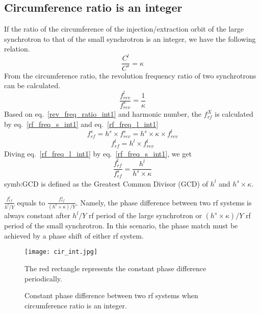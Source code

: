 \subsection{Circumference ratio is an integer}
If the ratio of the circumference of the injection/extraction orbit of the large synchrotron to that of the small synchrotron is an integer, we have the following relation. 
\begin{equation}
\frac{C^l}{C^s}=\kappa \label{circumference_ratio_int1}
\end{equation}
From the circumference ratio, the revolution frequency ratio of two synchrotrons can be calculated.
\begin{equation}
\frac{f_{\mathit{rev}}^{l}}{f_{\mathit{rev}}^{s}}=\frac{1}{\kappa} \label{rev_freq_ratio_int1}
\end{equation}
Based on eq.~\ref{rev_freq_ratio_int1} and harmonic number, the $f_{rf}^{X}$ is calculated by eq.~\ref{rf_freq_s_int1} and eq.~\ref{rf_freq_l_int1}
\begin{equation} 
f_{\mathit{rf}}^{s}= h^s \times f_{\mathit{rev}}^{s}=h^s \times \kappa \times f_{rev}^{l} \label{rf_freq_s_int1}
\end{equation}
\begin{equation} 
f_{\mathit{rf}}^{l}= h^l \times f_{\mathit{rev}}^{l} \label{rf_freq_l_int1}
\end{equation}
Diving eq.~\ref{rf_freq_l_int1} by eq.~\ref{rf_freq_s_int1}, we get
\begin{equation} 
\frac{f_{\mathit{rf}}^{l}}{f_{\mathit{rf}}^{s}}= \frac{h^l}{h^s \times \kappa} \label{rf_freq_ratio1}
\end{equation}
\gls{symb:GCD} is defined as the Greatest Common Divisor (\gls{GCD}) of $h^l$ and $h^s \times \kappa$.

$\frac{f_{\mathit{rf}}^{l}}{h^l/Y}$ equals to $\frac{f_{\mathit{rf}}^{s}}{(h^s\times \kappa)/Y}$. Namely, the phase difference between two rf systems is always constant after ${h^l/Y}$ rf period of the large synchrotron or ${(h^s\times \kappa)/Y}$ rf period of the small synchrotron. In this scenario, the phase match must be achieved by a phase shift of either rf system. 
\begin{figure}[!htb]
   \centering   
   \texttt{[image: cir\_int.jpg]}
   \caption{Constant phase difference between two rf systems when circumference ratio is an integer.}{The red rectangle represents the constant phase difference periodically.}
   \label{cir_int}
\end{figure} 

